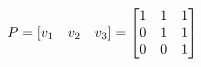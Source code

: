 \documentclass[preview]{standalone}
\begin{document}
\begin{align*}
\special{dvisvgm:raw <g id='unique000'>}P = [v_1 \quad v_2 \quad v_3] = \begin{bmatrix} 1 & 1 & 1 \\ 0 & 1 & 1 \\ 0 & 0 & 1 \end{bmatrix}\special{dvisvgm:raw </g>}
\end{align*}
\end{document}
